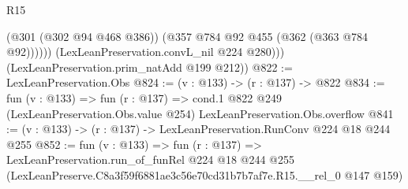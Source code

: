 \begin{lexlean}{R15}
\begin{coremodule}
                (@301 (@302 @94 @468 @386))
                (@357 @784 @92 @455 (@362 (@363 @784 @92))))))
          (LexLeanPreservation.convL_nil @224 @280)))
      (LexLeanPreservation.prim_natAdd @199 @212))
@822 := LexLeanPreservation.Obs
@824 := (v : @133) -> (r : @137) -> @822
@834 := fun (v : @133) =>
  fun (r : @137) =>
  cond.{1} @822 @249 (LexLeanPreservation.Obs.value @254) LexLeanPreservation.Obs.overflow
@841 := (v : @133) -> (r : @137) -> LexLeanPreservation.RunConv @224 @18 @244 @255
@852 := fun (v : @133) =>
  fun (r : @137) =>
  LexLeanPreservation.run_of_funRel
    @224
    @18
    @244
    @255
    (LexLeanPreserve.C8a3f59f6881ae3c56e70cd31b7b7af7e.R15.__rel_0 @147 @159)
\end{coremodule}
\end{lexlean}
